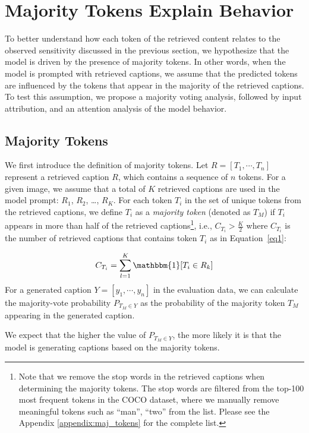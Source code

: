 

\section{Majority Tokens Explain Behavior}
\label{sec:mv} %

To better understand how each token of the retrieved content relates to the observed sensitivity discussed in the previous section, we hypothesize that the model is driven by the presence of majority tokens. In other words, when the model is prompted with retrieved captions, we assume that the predicted tokens are influenced by the tokens that appear in the majority of the retrieved captions. To test this assumption, we propose a majority voting analysis, followed by input attribution, and an attention analysis of the model behavior.

\subsection{Majority Tokens}
\label{subsection:mv_calc}
We first introduce the definition of majority tokens.
Let $R=[T_1, \cdots, T_n]$ represent a retrieved caption $R$, which contains a sequence of $n$ tokens. For a given image, we assume that a total of $K$ retrieved captions are used in the model prompt: $R_1$, $R_2$, \dots, $R_K$. For each token $T_i$ in the set of unique tokens from the retrieved captions, we define $T_i$ as a \textit{majority token} (denoted as $T_M$) if $T_i$ appears in more than half of the retrieved captions\footnote{Note that we remove the stop words in the retrieved captions when determining the majority tokens. The stop words are filtered from the top-100 most frequent tokens in the COCO dataset, where we manually remove meaningful tokens such as ``man'', ``two'' from the list. Please see the Appendix \ref{appendix:maj_tokens} for the complete list.}, i.e., $C_{T_i} > \frac{K}{2}$ where $C_{T_i}$ is the number of retrieved captions that contains token ${T_i}$ as in Equation~\ref{eq1}:

\begin{equation}
C_{T_i} = \sum_{l=1}^{K}\mathbbm{1}[T_i \in R_k]
\label{eq1}
\end{equation}
 For a generated caption $Y=[y_1, \cdots, y_n]$ in the evaluation data, we can calculate the majority-vote probability $P_{T_M \in Y}$ as the probability of the majority token $T_{M}$ appearing in the generated caption.

We expect that the higher the value of $P_{T_M \in Y}$, the more likely it is that the model is generating captions based on the majority tokens. 

